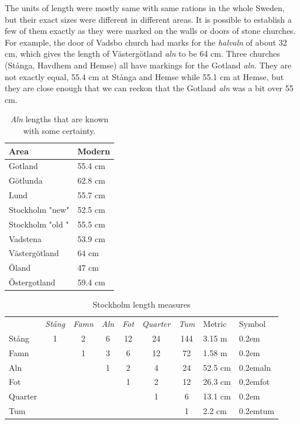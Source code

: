\documentclass[a4paper]{article}
\newcommand{\samplefont}{\fontsize{16}{16}\abcursivefamily\spaceskip0.2em}
\newcommand{\sample}[1]{{\samplefont #1 \strut}}
\begin{document}
The units of length were mostly same with same rations in the whole
Sweden, but their exact sizes were different in different areas. It is
possible to establish a few of them exactly as they were marked on the
walls or doors of stone churches. For example, the door of Vadsbo
church had marks for the \emph{halvaln} of about 32 cm, which gives
the length of Västergötland \emph{aln} to be 64 cm. Three churches
(Stånga, Havdhem and Hemse) all have markings for the Gotland
\emph{aln}. They are not exactly equal, 55.4 cm at Stånga and Hemse
while 55.1 cm at Hemse, but they are close enough that we can reckon
that the Gotland \emph{aln} was a bit over 55 cm.

\begin{table}
  \centering
  \begin{tabular}{ll}
    Area  & Modern \\
    \hline
    Gotland  & 55.4 cm \\
    Götlunda & 62.8 cm \\
    Lund &  55.7 cm \\
    Stockholm "new"& 52.5 cm \\
    Stockholm "old "& 55.5 cm \\
    Vadstena & 53.9 cm \\
    Västergötland & 64 cm \\
    Öland & 47 cm \\
    Östergotland & 59.4 cm \\
  \end{tabular}
  \caption{\emph{Aln} lengths that are known with some certainty.}
  \label{tab_aln_lengths}
\end{table}


\begin{table}
  \centering
  \begin{tabular}{lcccccc|ll}
    & \emph{Stång} & \emph{Famn} & \emph{Aln} & \emph{Fot} &
    \emph{Quarter} & \emph{Tum} & Metric & Symbol \\
    Stång & 1 & 2 & 6 & 12 & 24 & 144 & 3.15 m & \sample{\abstang} \\
    Famn  &   & 1 & 3 &  6 & 12 &  72 & 1.58 m & \sample{\abfamn} \\  
    Aln   &   &   & 1 &  2 &  4 &  24 &  52.5 cm & \sample{aln} \\
    Fot   &   &   &   &  1 &  2 &  12 &  26.3 cm & \sample{fot}\\
    Quarter & &   &   &    &  1 &   6 &  13.1 cm & \sample{\abquarter}\\
    Tum   &   &   &   &    &    &   1 &   2.2 cm & \sample{tum} \\
  \end{tabular}
  \caption{Stockholm length measures }
  \label{tab_length}
\end{table}
\end{document}
